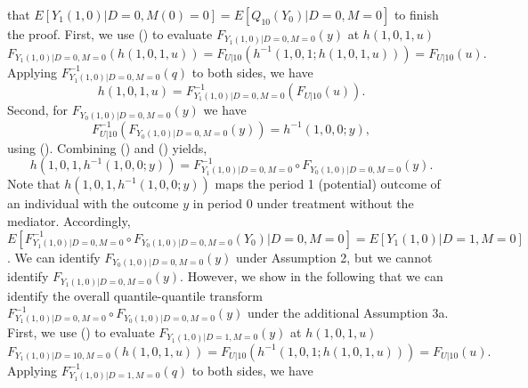\documentclass[a4paper,12pt]{article}
\begin{document}
 \doublespacing \pagestyle{plain}
that $E[Y_1(1,0)|D=0,M(0)=0]=E[Q_{10}(Y_0)|D=0,M=0]$ to finish the proof.
First, we use () to evaluate $F_{Y_1(1,0)|D=0,M=0}(y)$ at $h(1,0,1,u)$
\begin{equation*}
F_{Y_1(1,0)|D=0,M=0}(h(1,0,1,u)) = F_{U|10} ( h^{-1}(1,0,1;h(1,0,1,u)))  =F_{U|10} ( u).
\end{equation*}
Applying $F_{Y_1(1,0)|D=0,M=0}^{-1}(q)$ to both sides, we have
\begin{equation} 
h(1,0,1,u)  =F_{Y_1(1,0)|D=0,M=0}^{-1}(F_{U|10} ( u)).
\end{equation}
Second, for $F_{Y_0(1,0)|D=0,M=0}(y)$ we have
\begin{equation}
F_{U|10}^{-1} ( F_{Y_0(1,0)|D=0,M=0}(y)) =   h^{-1}(1,0,0;y),
\end{equation}
using (). Combining () and () yields,
\begin{equation} 
h(1,0,1,h^{-1}(1,0,0;y))  =F_{Y_1(1,0)|D=0,M=0}^{-1} \circ F_{Y_0(1,0)|D=0,M=0}(y) .
\end{equation}
Note that $h(1,0,1,h^{-1}(1,0,0;y))$ maps the period 1 (potential) outcome of an individual with the outcome $y$ in period 0 under treatment without the mediator. Accordingly, $E[F_{Y_1(1,0)|D=0,M=0}^{-1} \circ F_{Y_0(1,0)|D=0,M=0}(Y_0)|D=0,M=0]= E[Y_1(1,0)|D=1,M=0]$. We can identify $F_{Y_0(1,0)|D=0,M=0}(y)$ under Assumption 2, but we cannot identify $F_{Y_1(1,0)|D=0,M=0}(y)$. However, we show in the following that we can identify the overall quantile-quantile transform $F_{Y_1(1,0)|D=0,M=0}^{-1} \circ F_{Y_0(1,0)|D=0,M=0}(y)$ under the additional Assumption 3a.
First, we use () to evaluate $F_{Y_1(1,0)|D=1,M=0}(y)$ at $h(1,0,1,u)$
\begin{equation*}
F_{Y_1(1,0)|D=10,M=0}(h(1,0,1,u)) = F_{U|10} ( h^{-1}(1,0,1;h(1,0,1,u)))  =F_{U|10} ( u).
\end{equation*}
Applying $F_{Y_1(1,0)|D=1,M=0}^{-1}(q)$ to both sides, we have
\end{document}
